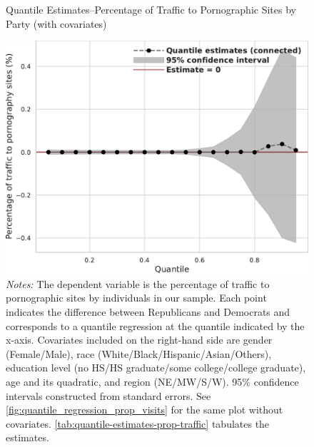 \documentclass[12pt, letterpaper]{article}
\begin{document}
\begin{figure}
	\centering
	\caption{Quantile Estimates--Percentage of Traffic to Pornographic Sites by Party (with covariates)}
	\includegraphics[width=.55\linewidth]{figs/quantile_reg_covariates_proportion_visits_adult.pdf}
	\caption*{\footnotesize \emph{Notes:} 
		The dependent variable is the percentage of traffic to pornographic sites by individuals in our sample.
		Each point indicates the difference between Republicans and Democrats and corresponds to a quantile regression at the quantile indicated by the x-axis.
		Covariates included on the right-hand side are gender (Female/Male), race (White/Black/Hispanic/Asian/Others), education level (no HS/HS graduate/some college/college graduate), age and its quadratic, and region (NE/MW/S/W).
		95\% confidence intervals constructed from standard errors.
		See \cref{fig:quantile_regression_prop_visits} for the same plot without covariates.
            \cref{tab:quantile-estimates-prop-traffic} tabulates the estimates.
	}
	\label{fig:quantile_regression_prop_visits_covariates}
\end{figure}
\end{document}
